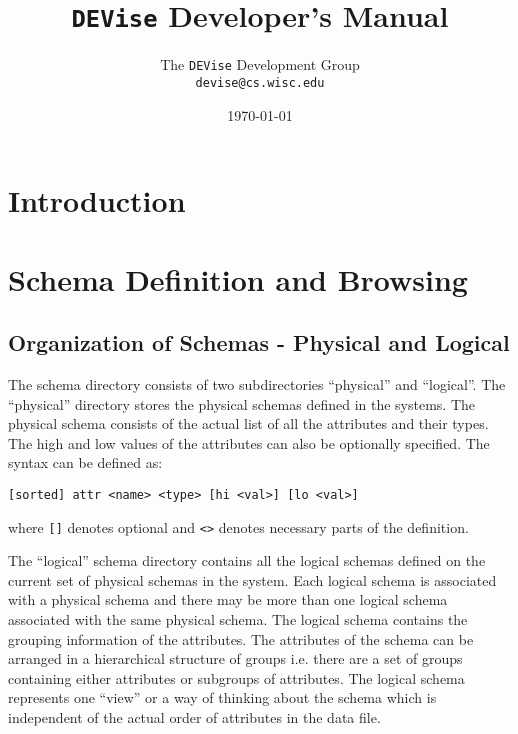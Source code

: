 
\def\Devise{{\tt DEVise} }
\def\filename#1{{\tt #1}}
\def\code#1{{\tt #1}}
\def\term#1{#1}
\def\variable#1{{\tt #1}}


\title{\Devise Developer's Manual}
\author{The \Devise Development Group \\
\code{devise@cs.wisc.edu}
}
\date{\today}

\maketitle

\section{Introduction}

\section{Schema Definition and Browsing}

\subsection{Organization of Schemas - Physical and Logical}

The schema directory consists of two subdirectories ``physical'' and
``logical''. The ``physical'' directory stores the physical schemas
defined in the systems.  The physical schema consists of the actual
list of all the attributes and their types. The high and low values of
the attributes can also be optionally specified.  The syntax can be
defined as:

\code{[sorted] attr <name> <type> [hi <val>] [lo <val>]}

where \code{[]} denotes optional and \code{<>} denotes necessary parts
of the definition.

The ``logical'' schema directory contains all the logical schemas
defined on the current set of physical schemas in the system.  Each
logical schema is associated with a physical schema and there may be
more than one logical schema associated with the same physical
schema. The logical schema contains the grouping information of the
attributes.  The attributes of the schema can be arranged in a
hierarchical structure of groups i.e. there are a set of groups
containing either attributes or subgroups of attributes. The logical
schema represents one ``view'' or a way of thinking about the schema
which is independent of the actual order of attributes in the data
file.


